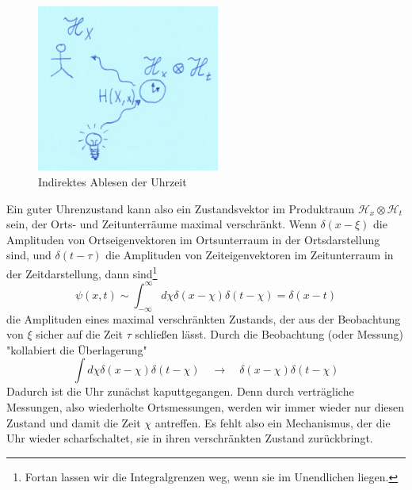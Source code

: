 \documentclass[12pt]{article}
\begin{document}
\begin{figure}[!h]\begin{center}
  \includegraphics[width=6cm]{Quantenuhr.png}
  \caption{Indirektes Ablesen der Uhrzeit}
  \label{fig:sr_game}
\end{center}\end{figure}

Ein guter Uhrenzustand kann also ein Zustandsvektor im Produktraum $\mathscr{H}_x \otimes \mathscr{H}_t$ sein, der Orts- und Zeitunterräume maximal verschränkt. Wenn $\delta(x-\xi)$ die Amplituden von Ortseigenvektoren im Ortsunterraum in der Ortsdarstellung sind, und $\delta(t-\tau)$ die Amplituden von Zeiteigenvektoren im Zeitunterraum in der Zeitdarstellung, dann sind\footnote{Fortan lassen wir die Integralgrenzen weg, wenn sie im Unendlichen liegen.}
\begin{equation} 
\label{eq:psi_clock}
\psi(x,t) \sim \int_{-\infty}^{\infty} d\chi \delta(x-\chi) \delta(t-\chi) = \delta(x-t)
\end{equation}
die Amplituden eines maximal verschränkten Zustands, der aus der Beobachtung von $\xi$ sicher auf die Zeit $\tau$ schließen lässt. Durch die Beobachtung (oder Messung) "kollabiert die Überlagerung"
\begin{equation} 
\label{eq:collapse}
\int d\chi \delta(x-\chi) \delta(t-\chi) \quad \rightarrow \quad \delta(x-\chi)\delta(t-\chi)
\end{equation}
Dadurch ist die Uhr zunächst kaputtgegangen. Denn durch verträgliche Messungen, also wiederholte Ortsmessungen, werden wir immer wieder nur diesen Zustand und damit die Zeit $\chi$ antreffen. Es fehlt also ein Mechanismus, der die Uhr wieder scharfschaltet, sie in ihren verschränkten Zustand zurückbringt.
\end{document}
